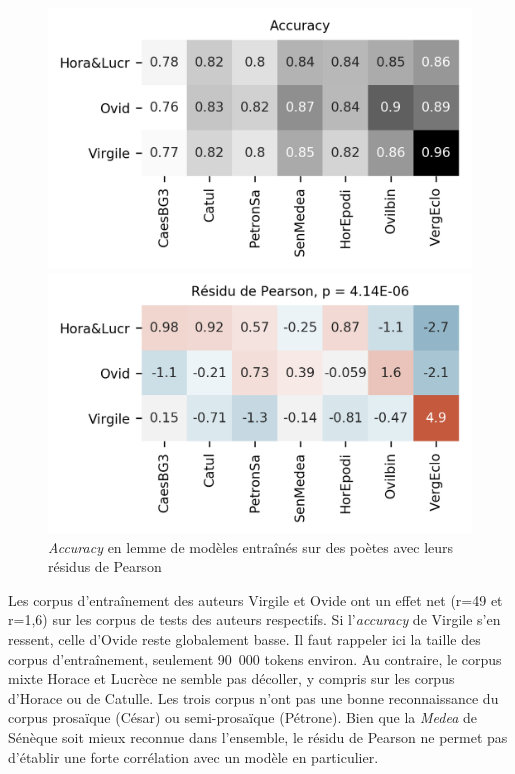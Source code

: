 \begin{figure}[ht]
    \hspace*{-0.05\linewidth}
    \begin{minipage}[c]{0.55\linewidth}
        \includegraphics[width=1\linewidth]{results/lemmatisation/longreeVariante/LongreeVariante-AccuracyStyleDePoesie-Lemme.png}
    \end{minipage} \hfill
    \begin{minipage}[c]{0.55\linewidth}
        \includegraphics[width=1\linewidth]{results/lemmatisation/longreeVariante/LongreeVariante-AssocPlotStyleDePoesie-Lemme.png}
    \end{minipage}
    \caption{\textit{Accuracy} en lemme de modèles entraînés sur des poètes avec leurs résidus de Pearson}
    \label{fig:lemmatisation:longree:poetes}
\end{figure}

Les corpus d'entraînement des auteurs Virgile et Ovide ont un effet net (r=49 et r=1,6) sur les corpus de tests des auteurs respectifs. Si l'\textit{accuracy} de Virgile s'en ressent, celle d'Ovide reste globalement basse. Il faut rappeler ici la taille des corpus d'entraînement, seulement 90~000 tokens environ. Au contraire, le corpus mixte Horace et Lucrèce ne semble pas décoller, y compris sur les corpus d'Horace ou de Catulle. Les trois corpus n'ont pas une bonne reconnaissance du corpus prosaïque (César) ou semi-prosaïque (Pétrone). Bien que la \textit{Medea} de Sénèque soit mieux reconnue dans l'ensemble, le résidu de Pearson ne permet pas d'établir une forte corrélation avec un modèle en particulier.

